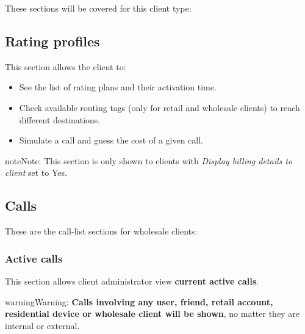 \documentclass[letterpaper,10pt,english]{sphinxmanual}
\begin{document}
These sections will be covered for this client type:


\subsection{Rating profiles}
\label{administration_portal/client/wholesale/rating_profiles:rating-profiles}\label{administration_portal/client/wholesale/rating_profiles::doc}
This section allows the client to:
\begin{itemize}
\item {} 
See the list of rating plans and their activation time.

\item {} 
Check available routing tags (only for retail and wholesale clients) to reach different destinations.

\item {} 
Simulate a call and guess the cost of a given call.

\end{itemize}

\begin{notice}{note}{Note:}
This section is only shown to clients with \emph{Display billing details to client} set to Yes.
\end{notice}


\subsection{Calls}
\label{administration_portal/client/wholesale/calls/index::doc}\label{administration_portal/client/wholesale/calls/index:calls}
These are the call-list sections for wholesale clients:


\subsubsection{Active calls}
\label{administration_portal/client/wholesale/calls/active_calls::doc}\label{administration_portal/client/wholesale/calls/active_calls:active-calls}
This section allows client administrator view \textbf{current active calls}.

\begin{notice}{warning}{Warning:}
\textbf{Calls involving any user, friend, retail account, residential device or wholesale client will be shown},
no matter they are internal or external.
\end{notice}
\end{document}

